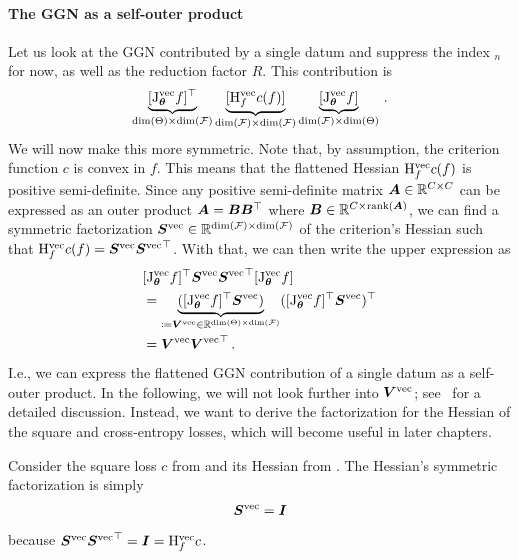 \paragraph{The GGN as a self-outer product}
Let us look at the GGN contributed by a single datum and suppress the index $_n$ for now, as well as the reduction factor $R$.
This contribution is
\begin{align*}
  \underbrace{[\mathrm{J}_{{\bm{\theta}}}^{\operatorname{vec}} f]^{\top}}_{\dim(\Theta) \times \dim({\mathcal{F}})}
  \underbrace{[\mathrm{H}^{\operatorname{vec}}_{f} c(f)]}_{\dim({\mathcal{F}}) \times \dim({\mathcal{F}})}
  \underbrace{[\mathrm{J}_{{\bm{\theta}}}^{\operatorname{vec}} f]}_{\dim({\mathcal{F}}) \times \dim(\Theta)}\,.
\end{align*}
We will now make this more symmetric.
Note that, by assumption, the criterion function $c$ is convex in $f$.
This means that the flattened Hessian $\mathrm{H}^{\operatorname{vec}}_{f} c(f)$ is positive semi-definite.
Since any positive semi-definite matrix ${\bm{A}} \in {\mathbb{R}}^{C \times C}$ can be expressed as an outer product ${\bm{A}} = {\bm{B}} {\bm{B}}^{\top}$ where ${\bm{B}} \in {\mathbb{R}}^{C \times \operatorname{rank}({\bm{A}})}$, we can find a symmetric factorization ${\bm{S}}^{\operatorname{vec}} \in {\mathbb{R}}^{\dim({\mathcal{F}}) \times \dim({\mathcal{F}})}$ of the criterion's Hessian such that $\mathrm{H}^{\operatorname{vec}}_{f} c(f) = {\bm{S}}^{\operatorname{vec}} {{\bm{S}}^{\operatorname{vec}}}^{\top}$.
With that, we can then write the upper expression as
\begin{align*}
  &[\mathrm{J}_{{\bm{\theta}}}^{\operatorname{vec}} f]^{\top} {\bm{S}}^{\operatorname{vec}} {{\bm{S}}^{\operatorname{vec}}}^{\top} [\mathrm{J}_{{\bm{\theta}}}^{\operatorname{vec}} f]
  \\
  &=
  \underbrace{([\mathrm{J}_{{\bm{\theta}}}^{\operatorname{vec}} f]^{\top} {\bm{S}}^{\operatorname{vec}})}_{\coloneq {\bm{V}}^{\operatorname{vec}} \in {\mathbb{R}}^{\dim(\Theta) \times \dim({\mathcal{F}})}}
  ([\mathrm{J}_{{\bm{\theta}}}^{\operatorname{vec}} f]^{\top} {\bm{S}}^{\operatorname{vec}})^{\top}
  \\
  &=
  {\bm{V}}^{\operatorname{vec}} {{\bm{V}}^{\operatorname{vec}}}^{\top}\,.
\end{align*}
I.e., we can express the flattened GGN contribution of a single datum as a self-outer product.
In the following, we will not look further into ${\bm{V}}^{\operatorname{vec}}$; see~\cite{dangel2022vivit,papyan2019measurements} for a detailed discussion. Instead, we want to derive the factorization for the Hessian of the square and cross-entropy losses, which will become useful in later chapters.
\begin{example}\label{ex:mseloss_hessian_factorization}
  Consider the square loss $c$ from  and its Hessian from .
  The Hessian's symmetric factorization is simply
  \begin{align*}
    {\bm{S}}^{\operatorname{vec}} = {\bm{I}}
  \end{align*}
  because ${\bm{S}}^{\operatorname{vec}} {{\bm{S}}^{\operatorname{vec}}}^{\top} = {\bm{I}} = \mathrm{H}_{f}^{\operatorname{vec}}c$.
\end{example}

